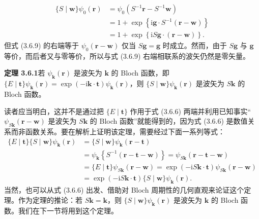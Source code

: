\begin{equation*}
\begin{aligned}
\{S \mid \mathbf{w}\}\psi_{0}(\mathbf{r}) &= \psi_{0}(S^{-1}\mathbf{r} - S^{-1}\mathbf{w})\\
&= 1 + \exp\left\{\mathrm{i}\mathbf{g} \cdot S^{-1}(\mathbf{r} - \mathbf{w})\right\}\\
&= 1 + \exp\left\{\mathrm{i}S\mathbf{g} \cdot (\mathbf{r} - \mathbf{w})\right\}.
\end{aligned}
\tag{3.6.9}
\end{equation*}
但式 (3.6.9) 的右端等于 $\psi_{0}(\mathbf{r} - \mathbf{w})$ 仅当 $S\mathbf{g} = \mathbf{g}$ 时成立。然而，由于 $S\mathbf{g}$ 与 $\mathbf{g}$ 等价，而后者又与零等价，所以与式 (3.6.9) 右端相联系的波矢仍然是零矢量。

\noindent\textbf{定理 3.6.1}\quad 若 $\psi_{\mathbf{k}}(\mathbf{r})$ 是波矢为 $\mathbf{k}$ 的 Bloch 函数，即 $\{E \mid \mathbf{t}\}\psi_{\mathbf{k}}(\mathbf{r}) = \exp(-\mathrm{i}\mathbf{k} \cdot \mathbf{t})\psi_{\mathbf{k}}(\mathbf{r})$，则 $\{S \mid \mathbf{w}\}\psi_{\mathbf{k}}(\mathbf{r})$ 是波矢为 $S\mathbf{k}$ 的 Bloch 函数。

读者应当明白，这并不是通过把 $\{E \mid \mathbf{t}\}$ 作用于式 (3.6.6) 两端并利用已知事实“$\psi_{S\mathbf{k}}(\mathbf{r} - \mathbf{w})$ 是波矢为 $S\mathbf{k}$ 的 Bloch 函数”就能得到的，因为式 (3.6.6) 是数值关系而非函数关系。要在解析上证明该定理，需要经过下面一系列等式：
\begin{equation*}
\begin{aligned}
\{E \mid \mathbf{t}\}\{S \mid \mathbf{w}\}\psi_{\mathbf{k}}(\mathbf{r}) &= \{S \mid \mathbf{w}\}\psi_{\mathbf{k}}(\mathbf{r} - \mathbf{t})\\
&= \psi_{\mathbf{k}}\left\{S^{-1}(\mathbf{r} - \mathbf{t} - \mathbf{w})\right\} = \psi_{S\mathbf{k}}(\mathbf{r} - \mathbf{t} - \mathbf{w})\\
&= \{E \mid \mathbf{t}\}\psi_{S\mathbf{k}}(\mathbf{r} - \mathbf{w}) = \exp(-\mathrm{i}S\mathbf{k} \cdot \mathbf{t})\psi_{S\mathbf{k}}(\mathbf{r} - \mathbf{w})\\
&= \exp(-\mathrm{i}S\mathbf{k} \cdot \mathbf{t})\{S \mid \mathbf{w}\}\psi_{\mathbf{k}}(\mathbf{r}).
\end{aligned}
\tag{3.6.10}
\end{equation*}
当然，也可以从式 (3.6.6) 出发、借助对 Bloch 周期性的几何直观来论证这个定理。作为定理的推论：若 $S\mathbf{k} = \mathbf{k}$，则 $\{S \mid \mathbf{w}\}\psi_{\mathbf{k}}(\mathbf{r})$ 是波矢为 $\mathbf{k}$ 的 Bloch 函数。我们在下一节将用到这个定理。
